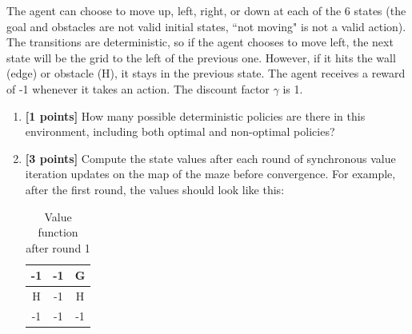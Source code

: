 \documentclass[11pt]{article}
\numberwithin{equation}{section} %
\numberwithin{figure}{section} %
\numberwithin{table}{section} %
\begin{document}
The agent can choose to move up, left, right, or down at each of the 6 states (the goal and obstacles are not valid initial states, ``not moving" is not a valid action). The transitions are deterministic, so if the agent chooses to move left, the next state will be the grid to the left of the previous one. However, if it hits the wall (edge) or obstacle (H), it stays in the previous state. The agent receives a reward of -1 whenever it takes an action. The discount factor $\gamma$ is 1.
 
\begin{enumerate}
\item \textbf{[1 points]} How many possible deterministic policies are there in this environment, including both optimal and non-optimal policies?

\begin{tcolorbox}[fit,height=3cm, width=\linewidth, blank, borderline={1pt}{-2pt},nobeforeafter]
\end{tcolorbox}


\newpage

\item \textbf{[3 points]} Compute the state values after each round of synchronous value iteration updates on the map of the maze before convergence. For example, after the first round, the values should look like this:

\begin{table}[H]
\begin{center}
  \begin{tabular}{ | c | c | c | }
    \hline
    -1 & -1 & G\\ \hline
    H & -1 & H \\ \hline
    -1 & -1 & -1 \\ \hline
  \end{tabular}
 \caption{Value function after round 1}
\end{center}
\end{table}

\begin{tcolorbox}[fit,height=3.5cm, width=\linewidth, blank, borderline={1pt}{-2pt},nobeforeafter]
    \def\arraystretch{1.5}
    

\end{tcolorbox}
\end{enumerate}
\end{document}
